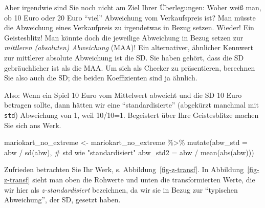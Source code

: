 \documentclass[
  letterpaper,
  oneside,
  open=any]{scrbook}
\newenvironment{Shaded}{\begin{snugshade}}{\end{snugshade}}
\newcommand{\AttributeTok}[1]{\textcolor[rgb]{0.40,0.45,0.13}{#1}}
\newcommand{\CommentTok}[1]{\textcolor[rgb]{0.37,0.37,0.37}{#1}}
\newcommand{\FunctionTok}[1]{\textcolor[rgb]{0.28,0.35,0.67}{#1}}
\newcommand{\NormalTok}[1]{\textcolor[rgb]{0.00,0.23,0.31}{#1}}
\newcommand{\OtherTok}[1]{\textcolor[rgb]{0.00,0.23,0.31}{#1}}
\newcommand{\SpecialCharTok}[1]{\textcolor[rgb]{0.37,0.37,0.37}{#1}}
\theoremstyle{definition}
\theoremstyle{definition}
\theoremstyle{definition}
\theoremstyle{remark}
\begin{document}
Aber irgendwie sind Sie noch nicht am Ziel Ihrer Überlegungen: Woher
weiß man, ob 10 Euro oder 20 Euro \enquote{viel} Abweichung vom
Verkaufspreis ist? Man müsste die Abweichung eines Verkaufpreis zu
irgendetwas in Bezug setzen. Wieder! Ein Geistesblitz! Man könnte doch
die jeweilige Abweichung in Bezug setzen zur \emph{mittleren (absoluten)
Abweichung} (MAA)! Ein alternativer, ähnlicher Kennwert zur mittlerer
absolute Abweichung ist die SD. Sie haben gehört, dass die SD
gebräuchlicher ist als die MAA. Um sich als Checker zu präsentieren,
berechnen Sie also auch die SD; die beiden Koeffizienten sind ja
ähnlich.

Also: Wenn ein Spiel 10 Euro vom Mittelwert abweicht und die SD 10 Euro
betragen sollte, dann hätten wir eine \enquote{standardisierte}
(abgekürzt manchmal mit \texttt{std}) Abweichung von 1, weil 10/10=1.
Begeistert über Ihre Geistesblitze machen Sie sich ans Werk.

\begin{Shaded}
\begin{Highlighting}[]
\NormalTok{mariokart\_no\_extreme }\OtherTok{\textless{}{-}}
\NormalTok{  mariokart\_no\_extreme }\SpecialCharTok{\%\textgreater{}\%} 
  \FunctionTok{mutate}\NormalTok{(}\AttributeTok{abw\_std =}\NormalTok{ abw }\SpecialCharTok{/} \FunctionTok{sd}\NormalTok{(abw),  }\CommentTok{\# std wie "standardisiert"}
         \AttributeTok{abw\_std2 =}\NormalTok{ abw }\SpecialCharTok{/} \FunctionTok{mean}\NormalTok{(}\FunctionTok{abs}\NormalTok{(abw)))  }
\end{Highlighting}
\end{Shaded}

Zufrieden betrachten Sie Ihr Werk, s. Abbildung~\ref{fig-z-transf}. In
Abbildung~\ref{fig-z-transf} sieht man oben die Rohwerte und unten die
transformierten Werte, die wir hier als \emph{z-standardisiert}
bezeichnen, da wir sie in Bezug zur \enquote{typischen Abweichung}, der
SD, gesetzt haben.
\end{document}
